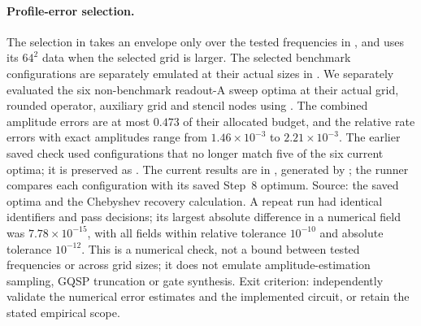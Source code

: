 \documentclass[11pt,a4paper]{article}
\begin{document}
\paragraph{Profile-error selection.}
The selection in  takes an envelope only
over the tested frequencies in , and
uses its $64^2$ data when the selected grid is larger. The selected benchmark
configurations are separately emulated at their actual sizes in
. We separately evaluated the six
non-benchmark readout-A sweep optima at their actual grid, rounded operator,
auxiliary grid and stencil nodes using
. The combined amplitude
errors are at most $0.473$ of their allocated budget, and the relative
rate errors with exact amplitudes range from $1.46\times10^{-3}$ to
$2.21\times10^{-3}$. The earlier saved check used configurations that no longer
match five of the six current optima; it is preserved as
. The current
results are in , generated by
; the runner compares each
configuration with its saved Step~8 optimum. Source: the saved optima and the
Chebyshev recovery calculation. A repeat run had identical identifiers and
pass decisions; its largest absolute difference in a numerical field was
$7.78\times10^{-15}$, with all fields within relative tolerance $10^{-10}$
and absolute tolerance $10^{-12}$. This is a numerical check, not
a bound between tested frequencies or across grid sizes; it does not emulate
amplitude-estimation sampling, GQSP truncation or gate synthesis. Exit
criterion: independently validate the numerical error estimates and the
implemented circuit, or retain the stated empirical scope.
\end{document}
